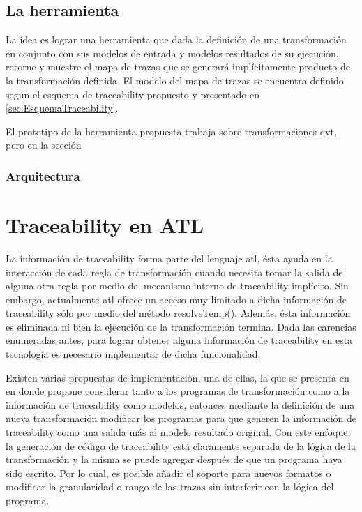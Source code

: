 \documentclass[a4paper,12pt,oneside,spanish]{book}
\begin{document}
\subsection{La herramienta}

La idea es lograr una herramienta que dada la definición de una transformación en conjunto con sus modelos de entrada y modelos resultados de su ejecución, retorne y muestre el mapa de trazas que se generará implícitamente producto de la transformación definida. El modelo del mapa de trazas se encuentra definido según el esquema de traceability propuesto y presentado en \ref{sec:EsquemaTraceability}.

El prototipo de la herramienta propuesta trabaja sobre transformaciones \gls{qvt}, pero en la sección 


\subsubsection{Arquitectura}



\section{Traceability en ATL}
\label{sec:ATLTtraceability}

La información de traceability forma parte del lenguaje \gls{atl}, ésta ayuda en la interacción de cada regla de transformación cuando necesita tomar la salida de alguna otra regla por medio del mecanismo interno de traceability implícito. Sin embargo, actualmente \gls{atl} ofrece un acceso muy limitado a dicha información de traceability sólo por medio del método resolveTemp(). Además, ésta información es eliminada ni bien la ejecución de la transformación termina. Dada las carencias enumeradas antes, para lograr obtener alguna información de traceability en esta tecnología es necesario implementar de dicha funcionalidad.

Existen varias propuestas de implementación, una de ellas, la que se presenta en \cite{Jouault} en donde propone considerar tanto a los programas de transformación como a la información de traceability como modelos, entonces mediante la definición de una nueva transformación modificar los programas para que generen la información de traceability como una salida más al modelo resultado original. Con este enfoque, la generación de código de traceability está claramente separada de la lógica de la transformación y la misma se puede agregar después de que un programa haya sido escrito. Por lo cual, es posible añadir el soporte para nuevos formatos o modificar la granularidad o rango de las trazas sin interferir con la lógica del programa.
\end{document}
